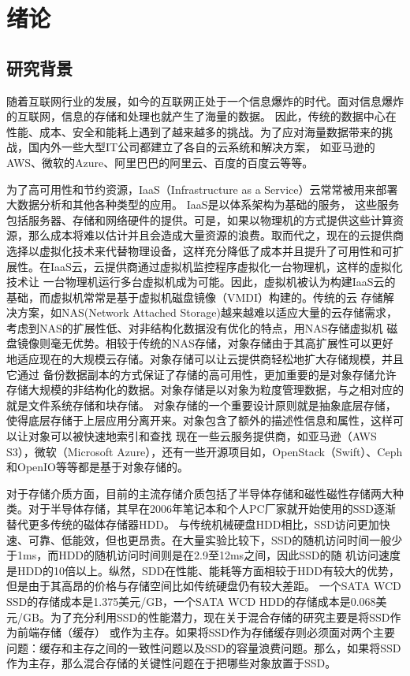 
\chapter{绪论}
\label{chap:intro}

\section{研究背景}
随着互联网行业的发展，如今的互联网正处于一个信息爆炸的时代。面对信息爆炸的互联网，信息的存储和处理也就产生了海量的数据。
因此，传统的数据中心在性能、成本、安全和能耗上遇到了越来越多的挑战。为了应对海量数据带来的挑战，国内外一些大型IT公司都建立了各自的云系统和解决方案，
如亚马逊的AWS、微软的Azure、阿里巴巴的阿里云、百度的百度云等等。

为了高可用性和节约资源，IaaS（Infrastructure as a Service）云常常被用来部署大数据分析和其他各种类型的应用。 IaaS是以体系架构为基础的服务，
这些服务包括服务器、存储和网络硬件的提供\cite{bhardwaj2010cloud}。可是，如果以物理机的方式提供这些计算资源，那么成本将难以估计并且会造成大量资源的浪费。取而代之，现在的云提供商
选择以虚拟化技术来代替物理设备，这样充分降低了成本并且提升了可用性和可扩展性。在IaaS云，云提供商通过虚拟机监控程序虚拟化一台物理机，这样的虚拟化技术让
一台物理机运行多台虚拟机成为可能\cite{feng2014price}。因此，虚拟机被认为构建IaaS云的基础，而虚拟机常常是基于虚拟机磁盘镜像（VMDI）构建的。传统的云
存储解决方案，如NAS(Network Attached Storage)越来越难以适应大量的云存储需求，考虑到NAS的扩展性低、对非结构化数据没有优化的特点，用NAS存储虚拟机
磁盘镜像则毫无优势。相较于传统的NAS存储，对象存储由于其高扩展性可以更好地适应现在的大规模云存储。对象存储可以让云提供商轻松地扩大存储规模，并且它通过
备份数据副本的方式保证了存储的高可用性，更加重要的是对象存储允许存储大规模的非结构化的数据。对象存储是以对象为粒度管理数据，与之相对应的就是文件系统存储和块存储。
对象存储的一个重要设计原则就是抽象底层存储，使得底层存储于上层应用分离开来。对象包含了额外的描述性信息和属性，这样可以让对象可以被快速地索引和查找
现在一些云服务提供商，如亚马逊（AWS S3），微软（Microsoft Azure），还有一些开源项目如，OpenStack\cite{sefraoui2012openstack}（Swift）、Ceph和OpenIO等等都是基于对象存储的。

对于存储介质方面，目前的主流存储介质包括了半导体存储和磁性磁性存储两大种类。对于半导体存储，其早在2006年笔记本和个人PC厂家就开始使用的SSD逐渐替代更多传统的磁体存储器HDD。
与传统机械硬盘HDD相比，SSD访问更加快速、可靠、低能效，但也更昂贵。在大量实验比较下，SSD的随机访问时间一般少于1ms，而HDD的随机访问时间则是在2.9至12ms之间，因此SSD的随
机访问速度是HDD的10倍以上\cite{kasavajhala2011solid}。纵然，SDD在性能、能耗等方面相较于HDD有较大的优势，但是由于其高昂的价格与存储空间比如传统硬盘仍有较大差距。
一个SATA WCD SSD的存储成本是1.375美元/GB，一个SATA WCD HDD的存储成本是0.068美元/GB。为了充分利用SSD的性能潜力，现在关于混合存储的研究主要是将SSD作为前端存储（缓存）
或作为主存。如果将SSD作为存储缓存则必须面对两个主要问题：缓存和主存之间的一致性问题以及SSD的容量浪费问题。那么，如果将SSD作为主存，那么混合存储的关键性问题在于把哪些对象放置于SSD。


